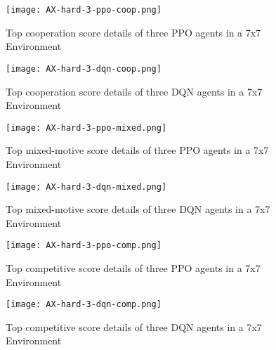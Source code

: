 \newpage
\vfill
\begin{figure}
    \centering
    \texttt{[image: AX-hard-3-ppo-coop.png]}\\
    \caption[Training Details of Top PPO Cooperation Executions in a 7x7 Environment]{Top cooperation score details of three PPO agents in a 7x7 Environment}\label{fig:ax-hard-2-ppo-coop}
\end{figure}
\vfill
\clearpage


\newpage
\vfill
\begin{figure}
    \centering
    \texttt{[image: AX-hard-3-dqn-coop.png]}\\
    \caption[Training Details of Top DQN Cooperation Executions in a 7x7 Environment]{Top cooperation score details of three DQN agents in a 7x7 Environment}\label{fig:ax-hard-2-dqn-coop}
\end{figure}
\vfill
\clearpage


\newpage
\vfill
\begin{figure}
    \centering
    \texttt{[image: AX-hard-3-ppo-mixed.png]}\\
    \caption[Training Details of Top PPO Mixed-Motive Executions in a 7x7 Environment]{Top mixed-motive score details of three PPO agents in a 7x7 Environment}\label{fig:ax-hard-2-ppo-mixed}
\end{figure}
\vfill
\clearpage


\newpage
\vfill
\begin{figure}
    \centering
    \texttt{[image: AX-hard-3-dqn-mixed.png]}\\
    \caption[Training Details of Top DQN Mixed-Motive Executions in a 7x7 Environment]{Top mixed-motive score details of three DQN agents in a 7x7 Environment}\label{fig:ax-hard-2-dqn-mixed}
\end{figure}
\vfill
\clearpage


\newpage
\vfill
\begin{figure}
    \centering
    \texttt{[image: AX-hard-3-ppo-comp.png]}\\
    \caption[Training Details of Top PPO Competitive Executions in a 7x7 Environment]{Top competitive score details of three PPO agents in a 7x7 Environment}\label{fig:ax-hard-2-ppo-comp}
\end{figure}
\vfill
\clearpage


\newpage
\vfill
\begin{figure}
    \centering
    \texttt{[image: AX-hard-3-dqn-comp.png]}\\
    \caption[Training Details of Top DQN Competitive Executions in a 7x7 Environment]{Top competitive score details of three DQN agents in a 7x7 Environment}\label{fig:ax-hard-2-dqn-comp}
\end{figure}
\vfill
\clearpage


